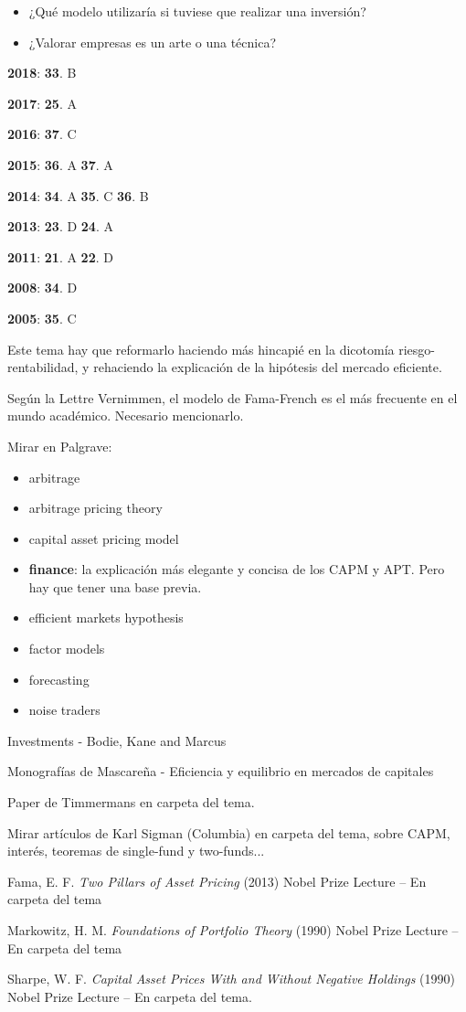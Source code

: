 \documentclass{nuevotema}
\begin{document}
\begin{itemize}
    \item ¿Qué modelo utilizaría si tuviese que realizar una inversión?
    \item ¿Valorar empresas es un arte o una técnica?
\end{itemize}

\notas

\textbf{2018}: \textbf{33}. B
 
\textbf{2017}: \textbf{25}. A

\textbf{2016}: \textbf{37}. C

\textbf{2015}: \textbf{36}. A \textbf{37}. A

\textbf{2014}: \textbf{34}. A \textbf{35}. C \textbf{36}. B

\textbf{2013}: \textbf{23}. D \textbf{24}. A

\textbf{2011}: \textbf{21}. A \textbf{22}. D

\textbf{2008}: \textbf{34}. D

\textbf{2005}: \textbf{35}. C

Este tema hay que reformarlo haciendo más hincapié en la dicotomía riesgo-rentabilidad, y rehaciendo la explicación de la hipótesis del mercado eficiente.

Según la Lettre Vernimmen, el modelo de Fama-French es el más frecuente en el mundo académico. Necesario mencionarlo.


\bibliografia

Mirar en Palgrave:
\begin{itemize}
	\item arbitrage
	\item arbitrage pricing theory
    \item capital asset pricing model
    \item \textbf{finance}: la explicación más elegante y concisa de los CAPM y APT. Pero hay que tener una base previa.
    \item efficient markets hypothesis
    \item factor models
    \item forecasting
    \item noise traders
\end{itemize}

Investments - Bodie, Kane and Marcus

Monografías de Mascareña - Eficiencia y equilibrio en mercados de capitales

Paper de Timmermans en carpeta del tema.

Mirar artículos de Karl Sigman (Columbia) en carpeta del tema, sobre CAPM, interés, teoremas de single-fund y two-funds...

Fama, E. F. \textit{Two Pillars of Asset Pricing} (2013) Nobel Prize Lecture -- En carpeta del tema

Markowitz, H. M. \textit{Foundations of Portfolio Theory} (1990) Nobel Prize Lecture -- En carpeta del tema

Sharpe, W. F. \textit{Capital Asset Prices With and Without Negative Holdings} (1990) Nobel Prize Lecture -- En carpeta del tema.
\end{document}
